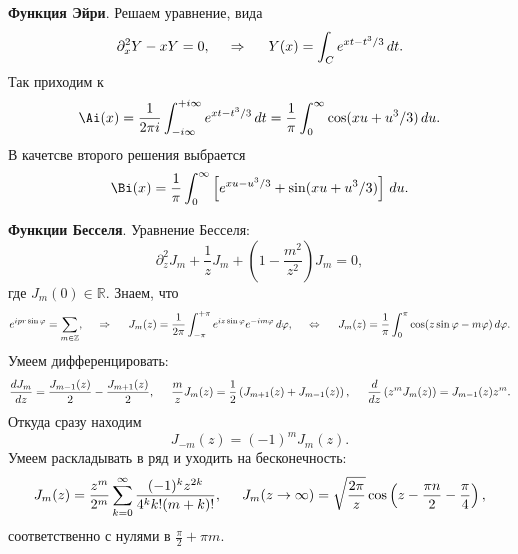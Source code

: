 \textbf{Функция Эйри}. Решаем уравнение, вида
\begin{equation*}
    \partial_x^2 Y - x Y = 0,
    \hspace{0.5cm} \Rightarrow \hspace{0.5cm}
    Y(x) = \int_C e^{x t - t^3/3} \, d t.
\end{equation*}
Так приходим к
\begin{equation*}
    \Ai (x) = 
    \frac{1}{2 \pi i} \int_{- i \infty}^{+i \infty} e^{xt - t^3/3} \d t= 
    \frac{1}{\pi} \int_{0}^{\infty} \cos(x u + u^3/3) \d u.
\end{equation*}
В качетсве второго решения выбрается 
\begin{equation*}
    \Bi (x) = \frac{1}{\pi} \int_{0}^{\infty} \left[
        e^{xu - u^3/3}  + \sin (xu + u^3/3)
    \right]\d u.
\end{equation*}



\textbf{Функции Бесселя}. Уравнение Бесселя:
\begin{equation*}
    \partial_z^2 J_m + \frac{1}{z} J_m + \left(1 - \frac{m^2}{z^2}\right) J_m = 0,
\end{equation*}
где $J_m(0) \in \mathbb{R}$. Знаем, что
\begin{equation*}
    e^{i p r \sin \varphi} = \sum_{m \in \mathbb{Z}},
    \hspace{0.5cm} \Rightarrow \hspace{0.5cm}
    J_m (z) = \frac{1}{2\pi} \int_{-\pi}^{+\pi}e^{i z \sin \varphi} e^{- i m \varphi} \, d \varphi,
    \hspace{5 mm} 
    \Leftrightarrow
    \hspace{5 mm} 
    J_m (z) = \frac{1}{\pi} \int_{0}^{\pi} \cos(z \sin \varphi - m \varphi) \, d \varphi.
\end{equation*}
Умеем дифференцировать:
\begin{equation*}
    \frac{d J_m}{d z} = \frac{J_{m-1} (z)}{2} - \frac{J_{m+1}(z)}{2},
    \hspace{5 mm}
    \frac{m}{z} J_m (z) = \frac{1}{2} \left(J_{m+1} (z) + J_{m-1}(z)\right),
    \hspace{5 mm} 
    \frac{d }{d z} \left(z^m J_m (z)\right) = J_{m-1} (z) z^m.
\end{equation*}
Откуда сразу находим
\begin{equation*}
    J_{-m} (z) = (-1)^m J_m (z).
\end{equation*}
Умеем раскладывать в ряд и уходить на бесконечность:
\begin{equation*}
    J_m (z) = \frac{z^m}{2^m} \sum_{k=0}^{\infty} \frac{(-1)^k z^{2k}}{4^k k! (m+k)!},
    \hspace{5 mm} 
    J_m (z \to \infty) = \sqrt{\frac{2 \pi}{z}} \cos\left(
        z - \frac{\pi n }{2} - \frac{\pi}{4}
    \right),
\end{equation*}
соответственно с нулями в $\frac{\pi}{2} + \pi m$. 


